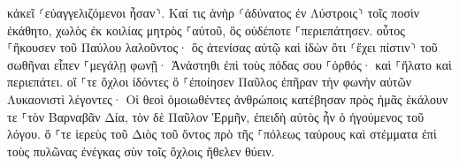 \documentclass{openreader}
\begin{document}
κἀκεῖ ⸂εὐαγγελιζόμενοι ἦσαν⸃. 
Καί τις ἀνὴρ ⸂ἀδύνατος ἐν Λύστροις⸃ τοῖς ποσὶν ἐκάθητο, χωλὸς ἐκ κοιλίας μητρὸς ⸀αὐτοῦ, ὃς οὐδέποτε ⸀περιεπάτησεν. 
οὗτος ⸀ἤκουσεν τοῦ Παύλου λαλοῦντος· ὃς ἀτενίσας αὐτῷ καὶ ἰδὼν ὅτι ⸂ἔχει πίστιν⸃ τοῦ σωθῆναι 
εἶπεν ⸀μεγάλῃ φωνῇ· Ἀνάστηθι ἐπὶ τοὺς πόδας σου ⸀ὀρθός· καὶ ⸀ἥλατο καὶ περιεπάτει. 
οἵ ⸀τε ὄχλοι ἰδόντες ὃ ⸀ἐποίησεν Παῦλος ἐπῆραν τὴν φωνὴν αὐτῶν Λυκαονιστὶ λέγοντες· Οἱ θεοὶ ὁμοιωθέντες ἀνθρώποις κατέβησαν πρὸς ἡμᾶς 
ἐκάλουν τε ⸀τὸν Βαρναβᾶν Δία, τὸν δὲ Παῦλον Ἑρμῆν, ἐπειδὴ αὐτὸς ἦν ὁ ἡγούμενος τοῦ λόγου. 
ὅ ⸀τε ἱερεὺς τοῦ Διὸς τοῦ ὄντος πρὸ τῆς ⸀πόλεως ταύρους καὶ στέμματα ἐπὶ τοὺς πυλῶνας ἐνέγκας σὺν τοῖς ὄχλοις ἤθελεν θύειν. 
\end{document}
